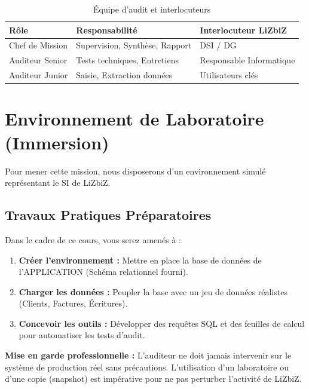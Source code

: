 \begin{table}[h!]
\centering
\begin{tabular}{lll}
    \toprule
    \textbf{Rôle} & \textbf{Responsabilité} & \textbf{Interlocuteur LiZbiZ} \\
    \midrule
    Chef de Mission & Supervision, Synthèse, Rapport & DSI / DG \\
    Auditeur Senior   & Tests techniques, Entretiens & Responsable Informatique \\
    Auditeur Junior   & Saisie, Extraction données   & Utilisateurs clés \\
    \bottomrule
\end{tabular}
\caption{Équipe d'audit et interlocuteurs}
\end{table}

\section{Environnement de Laboratoire (Immersion)}

Pour mener cette mission, nous disposerons d'un environnement simulé représentant le SI de LiZbiZ.

\subsection{Travaux Pratiques Préparatoires}

Dans le cadre de ce cours, vous serez amenés à :
\begin{enumerate}
    \item \textbf{Créer l'environnement :} Mettre en place la base de données de l'APPLICATION (Schéma relationnel fourni).
    \item \textbf{Charger les données :} Peupler la base avec un jeu de données réalistes (Clients, Factures, Écritures).
    \item \textbf{Concevoir les outils :} Développer des requêtes SQL et des feuilles de calcul pour automatiser les tests d'audit.
\end{enumerate}

\begin{boxalert}
\textbf{Mise en garde professionnelle :}
L'auditeur ne doit jamais intervenir sur le système de production réel sans précautions. L'utilisation d'un laboratoire ou d'une copie (snapshot) est impérative pour ne pas perturber l'activité de LiZbiZ.
\end{boxalert}

